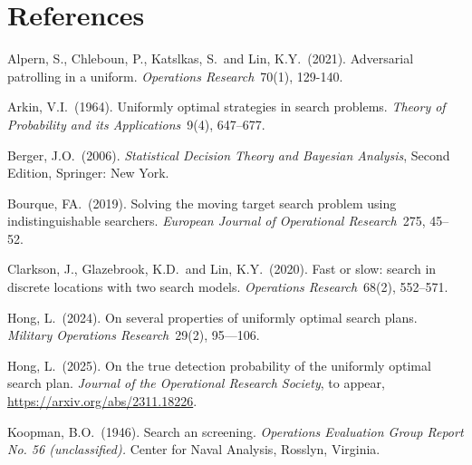 \documentclass[12pt]{article}
\theoremstyle{plain}
\theoremstyle{definition}
\theoremstyle{remark}
\begin{document}
\section*{References}
\begin{description}

\item{} Alpern, S., Chleboun, P., Katslkas, S.~and Lin, K.Y.~(2021).  Adversarial patrolling in a uniform. \emph{Operations Research}~70(1), 129-140.

\item{} Arkin, V.I.~(1964). Uniformly optimal strategies in search problems. \emph{Theory of Probability and its Applications}~9(4),  647--677. 

\item{} Berger, J.O.~(2006). \emph{Statistical Decision Theory and Bayesian Analysis}, Second Edition, Springer: New York.

\item{}Bourque, FA.~(2019).  Solving the moving target search problem using indistinguishable searchers. \emph{European Journal of Operational Research}~275, 45--52.



\item{} Clarkson, J., Glazebrook, K.D.~and Lin, K.Y.~(2020). Fast or slow: search in discrete locations with two search models. \emph{Operations Research}~68(2), 552--571.


\item{} Hong, L.~(2024).  On several properties of uniformly optimal search plans. \emph{Military Operations Research}~29(2), 95---106. 

\item{} Hong, L.~(2025).   On the true detection probability of the uniformly optimal search plan.  \emph{Journal of the Operational Research Society}, to appear, \url{https://arxiv.org/abs/2311.18226}.



\item{} Koopman, B.O.~(1946). Search an screening. \emph{Operations Evaluation Group Report No. 56 (unclassified).} Center for Naval Analysis, Rosslyn, Virginia. 


\end{description}
\end{document}

